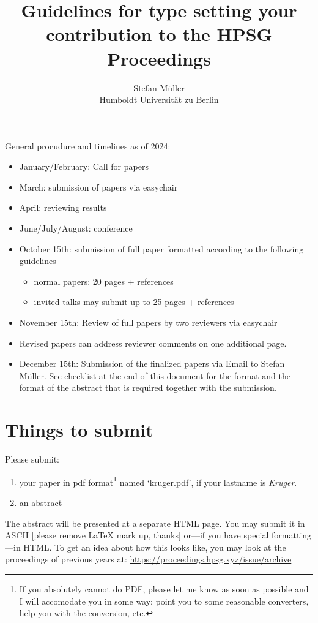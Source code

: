 \documentclass[11pt,a4paper,fleqn]{article}
\title{Guidelines for type setting your contribution to the HPSG Proceedings}
\author{Stefan Müller\\
Humboldt Universität zu Berlin}
\begin{document}
\maketitle

General procudure and timelines as of 2024:
\begin{itemize}
\item January/February: Call for papers
\item March: submission of papers via easychair
\item April: reviewing results
\item June/July/August: conference
\item October 15th: submission of full paper formatted according to the following guidelines
      \begin{itemize}
      \item normal papers: 20 pages + references
      \item invited talks may submit up to 25 pages + references
      \end{itemize}
\item November 15th: Review of full papers by two reviewers via easychair
\item Revised papers can address reviewer comments on one additional page.
\item December 15th: Submission of the finalized papers via Email to Stefan Müller. See checklist at
  the end of this document for the format and the format of the abstract that is required together
  with the submission.
\end{itemize}

\section{Things to submit}

Please submit:
\begin{enumerate}
\item your paper in pdf format\footnote{
If you absolutely cannot do PDF, please let me know as soon as
possible and I will accomodate you in some way: point you to some
reasonable converters, help you with the conversion, etc.}
%
 named `kruger.pdf', if your lastname is \emph{Kruger}.



\item an abstract
\end{enumerate}
The abstract will be presented at a separate HTML page. You may submit it in ASCII [please remove \LaTeX{} mark up, thanks]
or---if you have special formatting---in HTML. 
To get an idea about how this looks like,
you may look at the proceedings of previous years at:\newline
\url{https://proceedings.hpsg.xyz/issue/archive}
\end{document}
